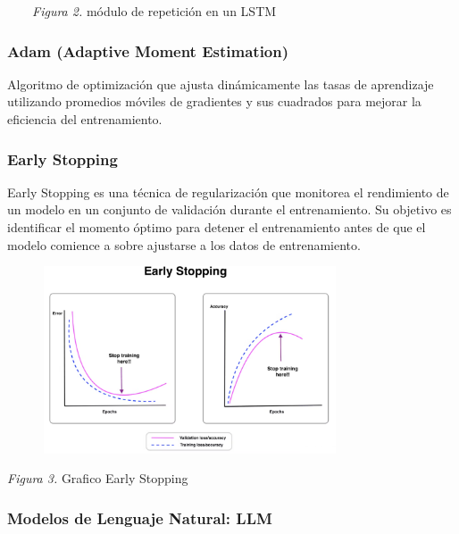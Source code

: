 \documentclass[10pt]{article}
\begin{document}
\begin{center}
\ \ \ \ \textit{Figura 2. }módulo de repetición en un LSTM
\end{center}


\vspace{2\baselineskip}
\subsubsection{Adam (Adaptive Moment Estimation)}

Algoritmo de optimización que ajusta dinámicamente las tasas de aprendizaje utilizando promedios móviles de gradientes y sus cuadrados para mejorar la eficiencia del entrenamiento.

\subsubsection{Early Stopping}

Early Stopping es una técnica de regularización que monitorea el rendimiento de un modelo en un conjunto de validación durante el entrenamiento. Su objetivo es identificar el momento óptimo para detener el entrenamiento antes de que el modelo comience a sobre ajustarse a los datos de entrenamiento. 

\vspace{1\baselineskip}
\begin{figure}[H]
\centering
\includegraphics[width=8.7cm,height=5.54cm]{./images/image2.png}
\end{figure}


\begin{center}
\textit{Figura 3. }Grafico Early Stopping
\end{center}


\subsubsection{Modelos de Lenguaje Natural: LLM}
\end{document}
